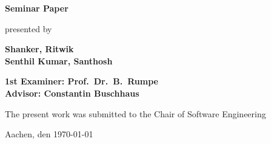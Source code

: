 \begin{titlepage}
\begin{flushleft}
{    {\Large \textbf{Seminar Paper}\\}
		\vspace{3em} 
		
		{\large presented by\\} 
    
    {\LARGE \textbf{Shanker, Ritwik}\\}
    {\LARGE \textbf{Senthil Kumar, Santhosh}\\}
    \vspace{3em} 
		    
    {\Large \textbf{1st Examiner: Prof.\ Dr.\ B.\ Rumpe}\\}
    \vspace{1em} 
    {\Large \textbf{Advisor: Constantin Buschhaus}\\}
    \vspace{7em} 

    {\large The present work was submitted to the Chair of Software Engineering \\}

    \vspace{1em}
		{\large	Aachen, den \today\\}
  }
\end{flushleft}

\end{titlepage}






